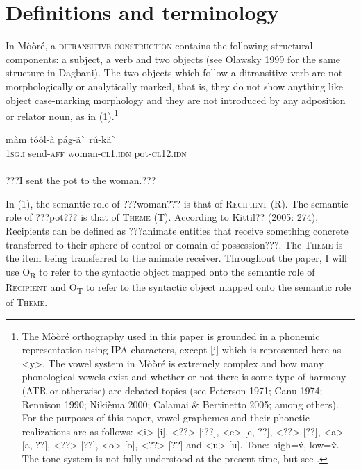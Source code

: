 \documentclass[output=paper]{langsci/langscibook}
\begin{document}
\section{Definitions and terminology}

In Mòòré, a \textsc{ditransitive construction} contains the following structural components: a subject, a verb and two objects (see Olawsky 1999 for the same structure in Dagbani). The two objects which follow a ditransitive verb are not morphologically or analytically marked, that is, they do not show anything like object case-marking morphology and they are not introduced by any adposition or relator noun, as in (1).\footnote{ {The Mòòré orthography used in this paper is grounded in a phonemic representation using IPA characters, except [j] which is represented here as {\textless}y{\textgreater}. The vowel system in Mòòré is extremely complex and how many phonological vowels exist and whether or not there is some type of harmony (ATR or otherwise) are debated topics (see Peterson 1971; Canu 1974; Rennison 1990; Nikièma 2000; Calamai \& Bertinetto 2005; among others). For the purposes of this paper, vowel graphemes and their phonetic realizations are as follows: {\textless}i{\textgreater} [i], {\textless}??{\textgreater} [i??], {\textless}e{\textgreater} [e, ??], {\textless}??{\textgreater} [??], {\textless}a{\textgreater} [a, ??], {\textless}??{\textgreater} [??], {\textless}o{\textgreater} [o], {\textless}??{\textgreater} [??] and {\textless}u{\textgreater} [u]. Tone: high=\'{v}, low=\`{v}. The tone system is not fully understood at the present time, but see \citet{Peterson1971}.} }


\ea \gll 
\label{bkm:Ref424141523}màm    tóól-à        pág-ã\`{ }             rú-kã\`{ }\\
\textsc{1sg.i}    send-\textsc{aff}      woman-\textsc{cl1.idn}       pot-\textsc{cl12.idn}\\
\\\glt ???I sent the pot to the woman.???  
\z

In (1), the semantic role of ???woman??? is that of \textsc{Recipient} (R).  The semantic role of ???pot??? is that of \textsc{Theme} (T). According to Kittil?? (2005: 274), Recipients can be defined as ???animate entities that receive something concrete transferred to their sphere of control or domain of possession???. The \textsc{Theme} is the item being transferred to the animate receiver. Throughout the paper, I will use O\textsubscript{R} to refer to the syntactic object mapped onto the semantic role of \textsc{Recipient} and O\textsubscript{T }to refer to the syntactic object mapped onto the semantic role of \textsc{Theme}. 
\end{document}
